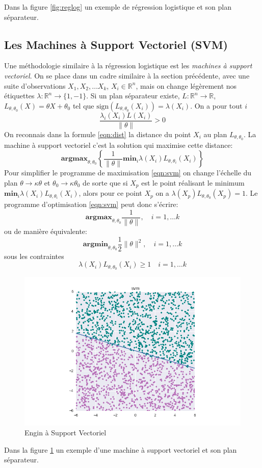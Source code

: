 \documentclass[DIV=calc, paper=a4, fontsize=11pt, twocolumn]{scrartcl}
\begin{document}
Dans la figure \ref{fig:reglog} un exemple de régression logistique et son plan séparateur.
\subsection{Les Machines à Support Vectoriel (SVM)}
Une méthodologie similaire à la régression logistique est les \emph{machines à support vectoriel}. On se place dans un cadre similaire à la section précédente, avec une suite d'observations $X_1, X_2, \ldots X_k$, $X_i \in \mathbb{R}^n$, mais on change légèrement nos étiquettes $\lambda : \mathbb{R}^n \to \{1, -1\}$. Si un plan séparateur existe, $L: \mathbb{R}^n \to \mathbb{R}$, $L_{\theta, \theta_0}(X) = \theta X + \theta_0$ tel que $\textrm{sign}(L_{\theta, \theta_0}(X_i)) = \lambda(X_i)$. On a pour tout $i$
\begin{equation}
\frac{\lambda_i(X_i)L(X_i)}{\|\theta\|}>0
\label{eqn:dist}
\end{equation}
On reconnais dans la formule \ref{eqn:dist} la distance du point $X_i$ au plan $L_{\theta, \theta_0}$. La machine à support vectoriel c'est la solution qui maximise cette distance:
\begin{equation}
\textbf{argmax}_{\theta, \theta_0} \left\{ \frac{1}{\|\theta\|} \textbf{min}_i\lambda(X_i)L_{\theta, \theta_i}(X_i)\right\}
\label{eqn:svm}
\end{equation}
Pour simplifier le programme de maximisation \ref{eqn:svm} on change l'échelle du plan $\theta \to \kappa \theta$ et $\theta_0 \to \kappa \theta_0$ de sorte que si $X_p$ est le point réalisant le minimum $\textbf{min}_i\lambda(X_i)L_{\theta, \theta_i}(X_i)$, alors pour ce point $X_p$ on a $\lambda(X_p)L_{\theta, \theta_0}(X_p) = 1$. Le programme d'optimisation \ref{eqn:svm} peut donc s'écrire:
$$\textbf{argmax}_{\theta, \theta_0}  \frac{1}{\|\theta\|}, \quad i = 1, \dots k$$
ou de manière équivalente: 
$$\textbf{argmin}_{\theta, \theta_0}  \frac{1}{2}\|\theta\|^2, \quad i = 1, \dots k$$
sous les contraintes
$$ \lambda(X_i)L_{\theta, \theta_0}(X_i) \geq 1 \quad i = 1, \ldots k$$
\begin{figure}
  \centering
    \includegraphics[width=\linewidth]{svm}
  \caption{Engin à Support Vectoriel}
  \label{fig:svm}
\end{figure}
Dans la figure \ref{fig:svm} un exemple d'une machine à support vectoriel et son plan séparateur.
\end{document}
